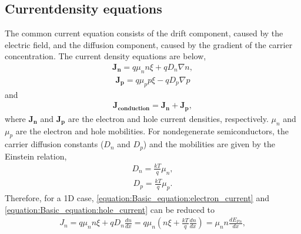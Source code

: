 \documentclass[letterpaper,10pt,english]{sphinxmanual}
\begin{document}
\subsection{Current\sphinxhyphen{}density equations}
\label{\detokenize{Basic_equation:current-density-equations}}
\sphinxAtStartPar
The common current equation consists of the drift component, caused by the electric field, and the diffusion component, caused by the gradient of the carrier concentration.
The current density equations are below,
\begin{equation}\label{equation:Basic_equation:electron_current}
\begin{split}\mathbf{J_n} = q\mu_nn\xi + qD_n\nabla n,\end{split}
\end{equation}\begin{equation}\label{equation:Basic_equation:hole_current}
\begin{split}\mathbf{J_p} = q\mu_pp\xi - qD_p\nabla p\end{split}
\end{equation}
\sphinxAtStartPar
and
\begin{equation}\label{equation:Basic_equation:total_current}
\begin{split}\mathbf{J_{conduction}} = \mathbf{J_n} + \mathbf{J_p},\end{split}
\end{equation}
\sphinxAtStartPar
where \(\mathbf{J_n}\) and \(\mathbf{J_p}\) are the electron and hole current densities, respectively.
\(\mu_n\) and \(\mu_ p\) are the electron and hole mobilities.
For nondegenerate semiconductors, the carrier diffusion constants (\(D_n\) and \(D_p\)) and the mobilities are given by the Einstein relation,
\begin{equation}\label{equation:Basic_equation:electron_diffusion}
\begin{split}D_n = \frac{kT}{q}\mu_n,\end{split}
\end{equation}\begin{equation}\label{equation:Basic_equation:hole_diffusion}
\begin{split}D_p = \frac{kT}{q}\mu_p.\end{split}
\end{equation}
\sphinxAtStartPar
Therefore, for a 1D case, \eqref{equation:Basic_equation:electron_current} and \eqref{equation:Basic_equation:hole_current} can be reduced to
\begin{equation}\label{equation:Basic_equation:electron_current_quasi_fermi}
\begin{split}J_n = q\mu_nn\xi + qD_n\frac{dn}{dx} = q\mu_n\left(n\xi + \frac{kT}{q}\frac{dn}{dx}\right) = \mu_nn\frac{dE_{Fn}}{dx},\end{split}
\end{equation}
\end{document}
